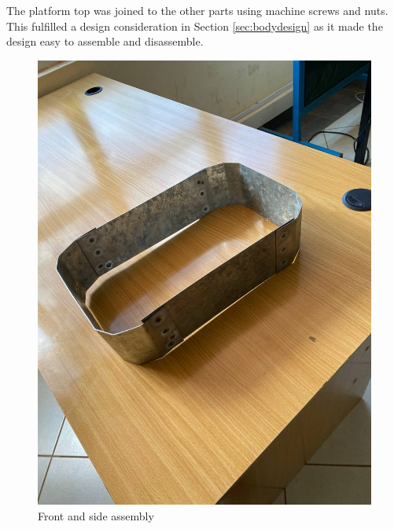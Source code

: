 The platform top was joined to the other parts using machine screws and nuts. This fulfilled a design consideration in Section \ref{sec:bodydesign} as it made the design easy to assemble and disassemble.

\begin{figure}[H]
    \centering
    \includegraphics[scale = 0.2]{Figures/platformBodyFAB.jpg}
    \caption{Front and side assembly}
    \label{fig:platformBFAB}
\end{figure}

